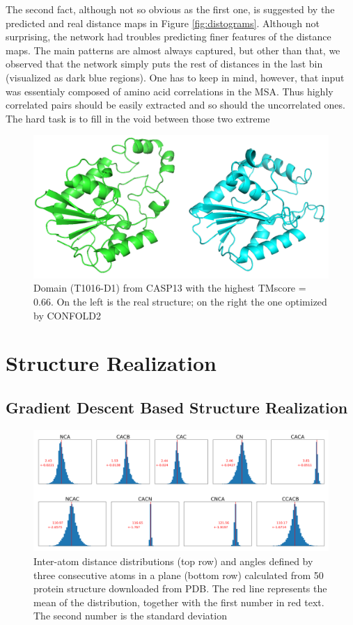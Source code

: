 The second fact, although not so obvious as the first one, is suggested by the predicted and real distance maps in Figure \ref{fig:distograms}. Although not surprising, the network had troubles predicting finer features of the distance maps. The main patterns are almost always captured, but other than that, we observed that the network simply puts the rest of distances in the last bin (visualized as dark blue regions). One has to keep in mind, however, that input was essentialy composed of amino acid correlations in the MSA. Thus highly correlated pairs should be easily extracted and so should the uncorrelated ones. The hard task is to fill in the void between those two extreme

\begin{figure}
    \centering
    \includegraphics[width=\linewidth]{imgs_tomas/T1016_structure.png}
    \caption{Domain (T1016-D1) from CASP13 with the highest TMscore = 0.66. On the left is the real structure; on the right the one optimized by CONFOLD2}
    \label{fig:T1016}
\end{figure}

\section{Structure Realization}

\subsection{Gradient Descent Based Structure Realization}

\begin{figure}
    \centering
    \includegraphics[width=\linewidth]{imgs_tomas/inter_data.png}
    \caption{Inter-atom distance distributions (top row) and angles defined by three consecutive atoms in a plane (bottom row) calculated from 50 protein structure downloaded from PDB. The red line represents the mean of the distribution, together with the first number in red text. The second number is the standard deviation}
    \label{fig:interresidue}
\end{figure}

